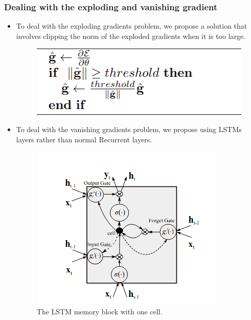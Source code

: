 \documentclass[
	11pt,
]{beamer}
\begin{document}
\begin{frame}
	\frametitle{Dealing with the exploding and vanishing gradient}
	\begin{itemize}
		\item To deal with the exploding gradients problem, we propose a solution that involves clipping the norm of the exploded
		gradients when it is too large.
	\begin{figure}[h]
		\centering
		\includegraphics[scale=0.5]{Images/gradient_clipping.png}
	\end{figure}
		\item To deal with the vanishing gradients problem, we propose using LSTMs layers rather than normal Recurrent layers.
	\begin{figure}[h]
		\centering
		\includegraphics[scale=0.45]{Images/lstm.png}
		\caption{The LSTM memory block with one cell.}
	\end{figure}
\end{itemize}
\end{frame}



\end{document}
